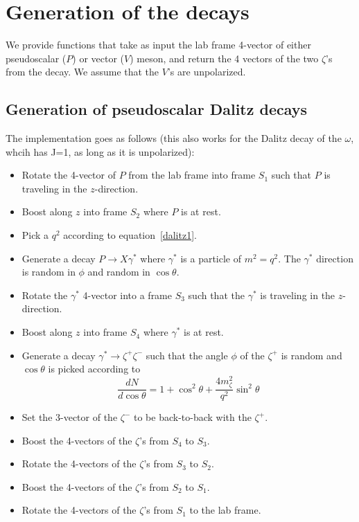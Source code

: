 \documentclass[12pt]{article}
\begin{document}
\clearpage
\section{Generation of the decays}

We provide functions that take as input the lab frame 4-vector of either pseudoscalar
($P$) or vector ($V$) meson, and return the 4 vectors of the two $\zeta$'s from the decay.
We assume that the $V$'s are unpolarized.


\subsection{Generation of pseudoscalar Dalitz decays}
The implementation goes as follows (this also works for the Dalitz
decay of the $\omega$, whcih has J=1,  as long as it is unpolarized):
\begin{itemize}
\item Rotate the 4-vector of $P$ from the lab frame into frame
  $S_1$ such that $P$ is traveling in the $z$-direction.
\item Boost along $z$ into frame $S_2$ where $P$ is at rest.
\item Pick a $q^2$ according to equation~\ref{dalitz1}.
\item Generate a decay $P \to X \gamma^*$ where $\gamma^*$ is
  a particle of $m^2 = q^2$.  The $\gamma^*$ direction is random
  in $\phi$ and random in $\cos \theta$.
\item Rotate the $\gamma^*$ 4-vector into a frame $S_3$ 
  such that the $\gamma^*$ is traveling in the $z$-direction.
\item Boost along $z$ into frame $S_4$ where $\gamma^*$ is at rest.
\item Generate a decay $\gamma^* \to \zeta^+ \zeta^-$ such that
  the angle $\phi$ of the $\zeta^+$ is random and
  $\cos \theta$ is picked according to~\cite{adlarson}
  \begin{equation}
    \frac{dN}{d \cos \theta} = 1 + \cos^2\theta + \frac{4 m^2_\zeta}{q^2} \sin^2\theta
    \label{dalitzAngles}
  \end{equation}
\item  Set the 3-vector of the $\zeta^-$ to be back-to-back with the $\zeta^+$.
\item Boost the 4-vectors of the $\zeta$'s from $S_4$ to $S_3$.
\item Rotate the 4-vectors of the $\zeta$'s from $S_3$ to $S_2$.
\item Boost the 4-vectors of the $\zeta$'s from $S_2$ to $S_1$.
\item Rotate the 4-vectors of the $\zeta$'s from $S_1$ to the lab frame.
\end{itemize}
\end{document}
